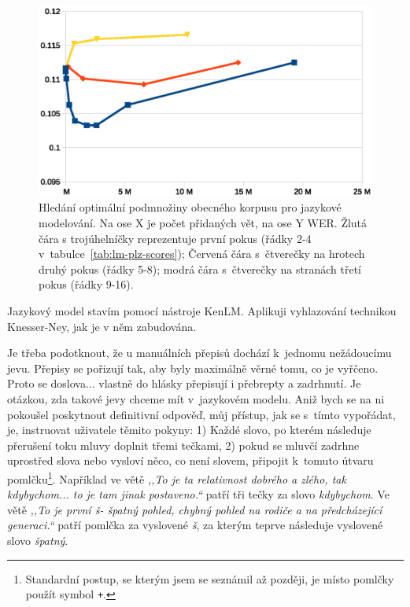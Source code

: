 \begin{figure}[htpb]
\includegraphics[scale=0.9]{rc/lm-plz-scores.eps}
\caption{
  Hledání optimální podmnožiny obecného korpusu pro jazykové modelování. Na ose
  X je počet přidaných vět, na ose Y WER. Žlutá čára s trojúhelníčky
  reprezentuje první pokus (řádky 2-4 v~tabulce~\ref{tab:lm-plz-scores});
  Červená čára s~čtverečky na hrotech druhý pokus (řádky 5-8); modrá čára
  s~čtverečky na stranách třetí pokus (řádky 9-16).
}
\label{fig:lm-plz-scores}
\end{figure}

Jazykový model stavím pomocí nástroje KenLM\cite{heafield2011kenlm}. Aplikuji
vyhlazování technikou Knesser-Ney\cite{chen1999empirical}, jak je v něm
zabudována.

Je třeba podotknout, že u manuálních přepisů dochází k~jednomu
nežádoucímu jevu. Přepisy se pořizují tak, aby byly maximálně věrné tomu, co je
vyřčeno. Proto se doslova... vlastně do hlásky přepisují i přebrepty a zadrhnutí.
Je otázkou, zda takové jevy chceme mít v~jazykovém modelu. Aniž bych se na ni
pokoušel poskytnout definitivní odpověď, můj přístup, jak se s~tímto vypořádat,
je, instruovat uživatele těmito pokyny: 1) Každé slovo, po kterém následuje přerušení toku
mluvy doplnit třemi tečkami,
2) pokud se mluvčí zadrhne uprostřed slova nebo vysloví něco, co není slovem,
připojit k~tomuto útvaru pomlčku\footnote{Standardní postup, se kterým jsem se
seznámil až později, je místo pomlčky použít symbol \texttt{+}.}. Například ve větě {\em ,,To je ta relativnost
dobrého a zlého, tak kdybychom... to je tam jinak postaveno.``} patří tři tečky
za slovo {\em kdybychom}. Ve větě {\em ,,To je první š- špatný pohled, chybný pohled na rodiče a na
předcházející generaci.``} patří pomlčka za vyslovené {\em š}, za kterým
teprve následuje vyslovené slovo {\em špatný}.

